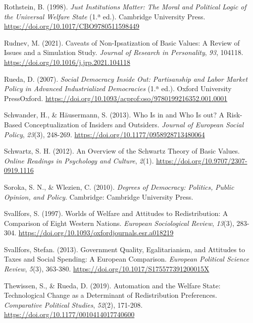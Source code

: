 \documentclass[
  spanish,
  12pt,
]{article}
\newlength{\cslhangindent}
\newenvironment{CSLReferences}[2] %
 {\begin{list}{}{%
  \setlength{\itemindent}{0pt}
  \setlength{\leftmargin}{0pt}
  \setlength{\parsep}{0pt}
  \ifodd #1
   \setlength{\leftmargin}{\cslhangindent}
   \setlength{\itemindent}{-1\cslhangindent}
  \fi
  \setlength{\itemsep}{#2\baselineskip}}}
 {\end{list}}
\begin{document}
\begin{CSLReferences}{1}{0}
Rothstein, B. (1998). \emph{Just {Institutions Matter}: {The Moral} and
{Political Logic} of the {Universal Welfare State}} (1.ª ed.). Cambridge
University Press. \url{https://doi.org/10.1017/CBO9780511598449}

Rudnev, M. (2021). Caveats of Non-Ipsatization of Basic Values: {A}
Review of Issues and a Simulation Study. \emph{Journal of Research in
Personality}, \emph{93}, 104118.
\url{https://doi.org/10.1016/j.jrp.2021.104118}

Rueda, D. (2007). \emph{Social {Democracy Inside Out}: {Partisanship}
and {Labor Market Policy} in {Advanced Industrialized Democracies}} (1.ª
ed.). Oxford University PressOxford.
\url{https://doi.org/10.1093/acprof:oso/9780199216352.001.0001}

Schwander, H., \& Häusermann, S. (2013). Who Is in and Who Is out? {A}
Risk-Based Conceptualization of Insiders and Outsiders. \emph{Journal of
European Social Policy}, \emph{23}(3), 248-269.
\url{https://doi.org/10.1177/0958928713480064}

Schwartz, S. H. (2012). An {Overview} of the {Schwartz Theory} of {Basic
Values}. \emph{Online Readings in Psychology and Culture}, \emph{2}(1).
\url{https://doi.org/10.9707/2307-0919.1116}

Soroka, S. N., \& Wlezien, C. (2010). \emph{Degrees of Democracy:
{Politics}, Public Opinion, and Policy}. Cambridge: Cambridge University
Press.

Svallfors, S. (1997). Worlds of {Welfare} and {Attitudes} to
{Redistribution}: {A Comparison} of {Eight Western Nations}.
\emph{European Sociological Review}, \emph{13}(3), 283-304.
\url{https://doi.org/10.1093/oxfordjournals.esr.a018219}

Svallfors, Stefan. (2013). Government Quality, Egalitarianism, and
Attitudes to Taxes and Social Spending: A {European} Comparison.
\emph{European Political Science Review}, \emph{5}(3), 363-380.
\url{https://doi.org/10.1017/S175577391200015X}

Thewissen, S., \& Rueda, D. (2019). Automation and the {Welfare State}:
{Technological Change} as a {Determinant} of {Redistribution
Preferences}. \emph{Comparative Political Studies}, \emph{52}(2),
171-208. \url{https://doi.org/10.1177/0010414017740600}


\end{CSLReferences}
\end{document}
